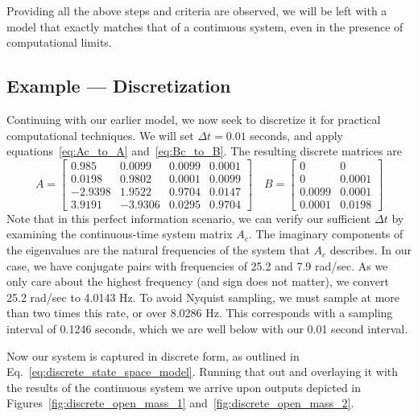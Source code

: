 Providing all the above steps and criteria are observed, we will be left with a model that exactly matches that of a continuous system, even in the presence of computational limits.

\FloatBarrier\subsection{Example --- Discretization} %
Continuing with our earlier model, we now seek to discretize it for practical computational techniques. We will set $\Delta t=0.01$ seconds, and apply equations~\ref{eq:Ac_to_A} and~\ref{eq:Bc_to_B}. The resulting discrete matrices are
\begin{equation}
    A = 
    \begin{bmatrix}
        0.985&0.0099&0.0099&0.0001\\0.0198&0.9802&0.0001&0.0099\\-2.9398&1.9522&0.9704&0.0147\\3.9191&-3.9306&0.0295&0.9704
    \end{bmatrix}
    \quad
    B = 
    \begin{bmatrix}
        0&0\\0&0.0001\\0.0099&0.0001\\0.0001&0.0198
    \end{bmatrix}
    \label{eq:discrete_A_B}
\end{equation}
Note that in this perfect information scenario, we can verify our sufficient $\Delta t$ by examining the continuous-time system matrix $A_c$. The imaginary components of the eigenvalues are the natural frequencies of the system that $A_c$ describes. In our case, we have conjugate pairs with frequencies of 25.2 and 7.9 rad/sec. As we only care about the highest frequency (and sign does not matter), we convert 25.2 rad/sec to 4.0143 Hz. To avoid Nyquist sampling, we must sample at more than two times this rate, or over 8.0286 Hz. This corresponds with a sampling interval of 0.1246 seconds, which we are well below with our 0.01 second interval.

Now our system is captured in discrete form, as outlined in Eq.~\ref{eq:discrete_state_space_model}. Running that out and overlaying it with the results of the continuous system we arrive upon outputs depicted in Figures~\ref{fig:discrete_open_mass_1} and~\ref{fig:discrete_open_mass_2}.

